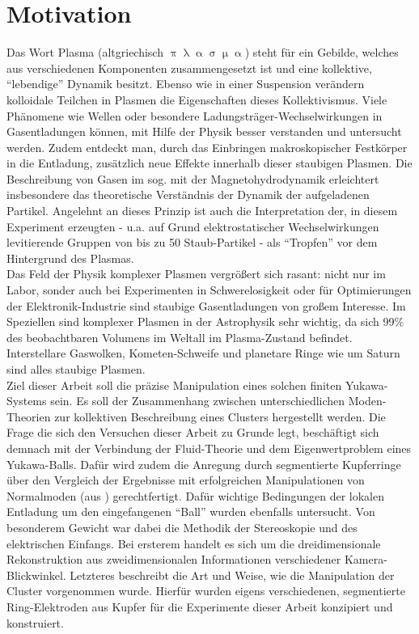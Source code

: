 \chapter{Motivation}\label{sec:einleitung}

  Das Wort Plasma (altgriechisch $\uppi\uplambda\upalpha\upsigma\upmu\upalpha$) steht für ein Gebilde, welches aus verschiedenen Komponenten zusammengesetzt ist und eine kollektive, "`lebendige"' Dynamik besitzt. Ebenso wie in einer Suspension verändern kolloidale Teilchen in Plasmen die Eigenschaften dieses Kollektivismus. Viele Phänomene wie Wellen oder besondere Ladungsträger-Wechselwirkungen in Gasentladungen können, mit Hilfe der Physik  besser verstanden und untersucht werden. Zudem entdeckt man, durch das Einbringen makroskopischer Festkörper in die Entladung, zusätzlich neue Effekte innerhalb dieser staubigen Plasmen. Die Beschreibung von Gasen im sog.  mit der Magnetohydrodynamik erleichtert insbesondere das theoretische Verständnis der Dynamik der aufgeladenen Partikel. Angelehnt an dieses Prinzip ist auch die Interpretation der, in diesem Experiment erzeugten  - u.a. auf Grund elektrostatischer Wechselwirkungen levitierende Gruppen von bis zu 50 Staub-Partikel - als "`Tropfen"' vor dem Hintergrund des Plasmas.\\
  Das Feld der Physik komplexer Plasmen vergrößert sich rasant: nicht nur im Labor, sonder auch bei Experimenten in Schwerelosigkeit oder für Optimierungen der Elektronik-Industrie sind staubige Gasentladungen von großem Interesse. Im Speziellen sind komplexer Plasmen in der Astrophysik sehr wichtig, da sich 99\% des beobachtbaren Volumens im Weltall im Plasma-Zustand befindet. Interstellare Gaswolken, Kometen-Schweife und planetare Ringe wie um Saturn sind alles staubige Plasmen.\\
  Ziel dieser Arbeit soll die präzise Manipulation eines solchen finiten Yukawa-Systems sein. Es soll der Zusammenhang zwischen unterschiedlichen Moden-Theorien zur kollektiven Beschreibung eines Clusters hergestellt werden. Die Frage die sich den Versuchen dieser Arbeit zu Grunde legt, beschäftigt sich demnach mit der Verbindung der Fluid-Theorie und dem Eigenwertproblem eines Yukawa-Balls. Dafür wird zudem die Anregung durch segmentierte Kupferringe über den Vergleich der Ergebnisse mit erfolgreichen Manipulationen von Normalmoden (aus \cite{Mulsow13}) gerechtfertigt. Dafür wichtige Bedingungen der lokalen Entladung um den eingefangenen "`Ball"' wurden ebenfalls untersucht. Von besonderem Gewicht war dabei die Methodik der Stereoskopie und des elektrischen Einfangs. Bei ersterem handelt es sich um die dreidimensionale Rekonstruktion aus zweidimensionalen Informationen verschiedener Kamera-Blickwinkel. Letzteres beschreibt die Art und Weise, wie die Manipulation der Cluster vorgenommen wurde. Hierfür wurden eigens verschiedenen, segmentierte Ring-Elektroden aus Kupfer für die Experimente dieser Arbeit konzipiert und konstruiert.\newline

